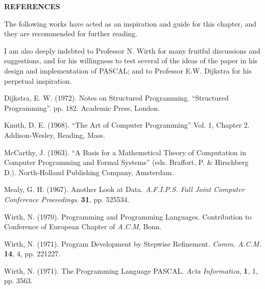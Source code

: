\noindent
\textbf{REFERENCES}
\medskip
\nopagebreak

\noindent
The following works have acted as an inspiration and guide for this chapter, and they are recommended for further reading.

I am also deeply indebted to Professor N. Wirth for many fruitful discussions and suggestions, and for his willingness to test several of the ideas of the paper in his design and implementation of PASCAL; and to Professor E.W. Dijkstra for his perpetual inspiration.
\medskip

\noindent
Dijkstra, E. W. (1972). Notes on Structured Programming. ``Structured Programming''. pp. 1\textendash{}82. Academic Press, London.
\medskip

\noindent
Knuth, D. E. (1968). ``The Art of Computer Programming'' Vol. 1, Chapter 2. Addison-Wesley, Reading, Mass.
\medskip

\noindent
McCarthy, J. (1963). ``A Basis for a Mathemetical Theory of Computation in Computer Programming and Formal Systems'' (eds. Braffort, P. \& Hirschberg D.). North-Holland Publishing Company, Amsterdam.
\medskip

\noindent
Mealy, G. H. (1967). Another Look at Data. \textit{A.F.I.P.S. Fall Joint Computer Conference Proceedings}. \textbf{31}, pp. 525\textendash{}534.
\medskip

\noindent
Wirth, N. (1970). Programming and Programming Languages. Contribution to Conference of European Chapter of \textit{A.C.M}, Bonn.
\medskip

\noindent
Wirth, N. (1971). Program Development by Stepwise Refinement. \textit{Comm. A.C.M.} \textbf{14}, 4, pp. 221\textendash{}227.
\medskip

\noindent
Wirth, N. (1971). The Programming Language PASCAL. \textit{Acta Informatica}, \textbf{1}, 1, pp. 35\textendash{}63.
